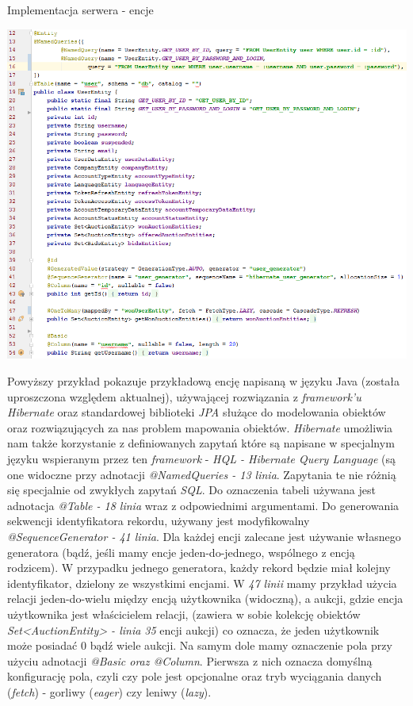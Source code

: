 \documentclass[10pt,titlepage]{article} %
\begin{document}
\begin{listing}[H]
\caption[Implementacja serwera - encje]{Implementacja serwera - encje}
\includegraphics[width=1.0\textwidth, height=0.85\textheight]{img/sekcja3/backend/encjaUzytkownik}
\end{listing} 

Powyższy przykład pokazuje przykładową encję napisaną w języku Java (została uproszczona względem aktualnej), używającej rozwiązania z \textit{framework'u} \textit{Hibernate} oraz standardowej biblioteki \textit{JPA} służące do modelowania obiektów oraz rozwiązujących za nas problem mapowania obiektów.
\textit{Hibernate} umożliwia nam także korzystanie z definiowanych zapytań które są napisane w specjalnym języku wspieranym przez ten \textit{framework} - \textit{HQL - Hibernate Query Language} (są one widoczne przy adnotacji \textit{@NamedQueries - 13 linia}. Zapytania te nie różnią się specjalnie od zwykłych zapytań \textit{SQL}. Do oznaczenia tabeli używana jest adnotacja \textit{@Table - 18 linia} wraz z odpowiednimi argumentami.    Do generowania sekwencji identyfikatora rekordu, używany jest modyfikowalny \textit{@SequenceGenerator - 41 linia}. Dla każdej encji zalecane jest używanie własnego generatora (bądź, jeśli mamy encje jeden-do-jednego, wspólnego z encją rodzicem). W przypadku jednego generatora, każdy rekord będzie miał kolejny identyfikator, dzielony ze wszystkimi encjami. W \textit{47 linii} mamy przykład użycia relacji jeden-do-wielu między encją użytkownika (widoczną), a aukcji, gdzie encja użytkownika jest właścicielem relacji, (zawiera w sobie kolekcję obiektów \textit{Set<AuctionEntity> - linia 35} encji aukcji) co oznacza, że jeden użytkownik może posiadać 0 bądź wiele aukcji. Na samym dole mamy oznaczenie pola przy użyciu adnotacji \textit{@Basic oraz @Column}. Pierwsza z nich oznacza domyślną konfigurację pola, czyli czy pole jest opcjonalne oraz tryb wyciągania danych (\textit{fetch}) - gorliwy (\textit{eager}) czy leniwy (\textit{lazy}).
\end{document}
